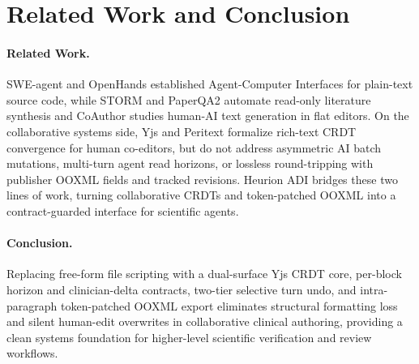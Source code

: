 \documentclass[11pt,a4paper]{article}
\begin{document}
\section{Related Work and Conclusion}
\label{sec:related_conclusion}

\paragraph{Related Work.}
SWE-agent \cite{yang2024sweagent} and OpenHands \cite{wang2024openhands} established Agent-Computer Interfaces for plain-text source code, while STORM \cite{shao2024storm} and PaperQA2 \cite{skarlinski2024paperqa2} automate read-only literature synthesis and CoAuthor \cite{lee2022coauthor} studies human-AI text generation in flat editors. On the collaborative systems side, Yjs \cite{nicolaescu2016yjs} and Peritext \cite{litt2022peritext} formalize rich-text CRDT convergence for human co-editors, but do not address asymmetric AI batch mutations, multi-turn agent read horizons, or lossless round-tripping with publisher OOXML \cite{ecma376ooxml} fields and tracked revisions. Heurion ADI bridges these two lines of work, turning collaborative CRDTs and token-patched OOXML into a contract-guarded interface for scientific agents.

\paragraph{Conclusion.}
Replacing free-form file scripting with a dual-surface Yjs CRDT core, per-block horizon and clinician-delta contracts, two-tier selective turn undo, and intra-paragraph token-patched OOXML export eliminates structural formatting loss and silent human-edit overwrites in collaborative clinical authoring, providing a clean systems foundation for higher-level scientific verification and review workflows.
\end{document}
